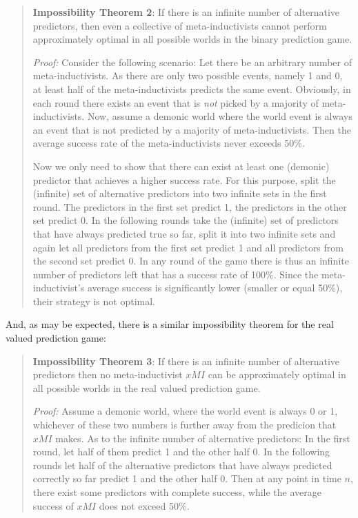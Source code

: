 \documentclass[12pt, a4paper]{article}
\numberwithin{equation}{section}
\begin{document}
\begin{quote}
{\bf Impossibility Theorem 2}: If there is an infinite number of
alternative predictors, then even a collective of meta-inductivists 
cannot perform approximately optimal in all possible worlds in the
binary prediction game.

{\em Proof:} Consider the following scenario: Let there be an arbitrary
number of meta-inductivists. As there are only two possible events,
namely 1 and 0, at least half of the meta-inductivists predicts the same
event. Obviously, in each round there exists an event that is {\em not}
picked by a majority of meta-inductivists. Now, assume a demonic
world where the world event is always an event that is not predicted by a
majority of meta-inductivists. Then the average success rate of the
meta-inductivists never exceeds 50\%.

Now we only need to show that there can exist at least one (demonic)
predictor that achieves a higher success rate. For this purpose, split
the (infinite) set of alternative predictors into two infinite sets in
the first round. The predictors in the first set predict 1, the
predictors in the other set predict 0. In the following rounds take the
(infinite) set of predictors that have always predicted true so far,
split it into two infinite sets and again let all predictors from the
first set predict 1 and all predictors from the second set predict 0. In
any round of the game there is thus an infinite number of predictors left
that has a success rate of 100\%. Since the meta-inductivist's average
success is significantly lower (smaller or equal 50\%), their strategy is
not optimal.
\end{quote}

And, as may be expected, there is a similar impossibility theorem for the real
valued prediction game:

\begin{quote}
{\bf Impossibility Theorem 3}: If there is an infinite number of alternative
predictors then no meta-inductivist $xMI$ can  
be approximately optimal in all possible worlds in the real valued prediction
game.

{\em Proof:} Assume a demonic world, where the world event is always 0 or 1,
whichever of these two numbers is further away from the predicion that $xMI$
makes. As to the infinite number of alternative predictors: In the first round,
let half of them predict 1 and the other half 0. In the following rounds let
half of the alternative predictors that have always predicted correctly so far
predict 1 and the other half 0. Then at any point in time $n$, there exist some
predictors with complete success, while the average success of $xMI$
does not exceed 50\%.
\end{quote}
\end{document}
